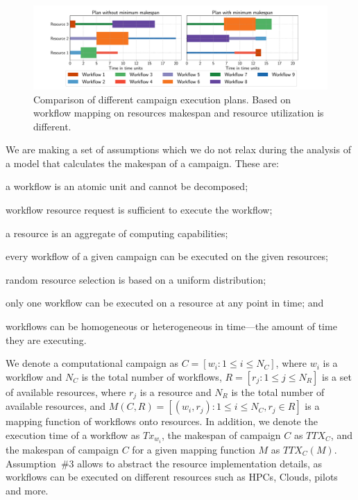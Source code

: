 \begin{figure}[ht!]
    \centering
    \includegraphics[width=.99\textwidth]{figures/campaign/plan_comp.pdf}
    \caption{Comparison of different campaign execution plans. Based on workflow mapping on resources makespan and resource utilization is different.}\label{fig:example_makespan}
\end{figure}

We are making a set of assumptions which we do not relax during the analysis of a model that calculates the makespan of a campaign.
These are:
\begin{inparaenum}[(1)]
    \item a workflow is an atomic unit and cannot be decomposed;
    \item workflow resource request is sufficient to execute the workflow;
    \item a resource is an aggregate of computing capabilities;
    \item every workflow of a given campaign can be executed on the given resources;
    \item random resource selection is based on a uniform distribution;
    \item only one workflow can be executed on a resource at any point in time; and
    \item workflows can be homogeneous or heterogeneous in time---the amount of time they are executing.
\end{inparaenum}

We denote a computational campaign as $C = [w_{i}: 1 \leq i \leq N_{C}]$, where $w_{i}$ is a workflow and $N_{C}$ is the total number of workflows, $R = [ r_{j}: 1 \leq j \leq N_{R}]$ is a set of available resources, where $r_{j}$ is a resource and $N_{R}$ is the total number of available resources, and $ M(C,R) = [(w_i, r_j): 1 \leq i \leq N_{C}, r_j \in R] $ is a mapping function of workflows onto resources.
In addition, we denote the execution time of a workflow as $Tx_{w_{i}}$, the makespan of campaign $C$ as $TTX_{C}$, and the makespan of campaign $C$ for a given mapping function $ M $ as $TTX_{C}(M)$.
Assumption~\#3 allows to abstract the resource implementation details, as workflows can be executed on different resources such as HPCs, Clouds, pilots and more. 

